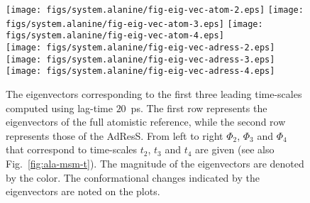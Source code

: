\documentclass[epjST]{svjour}
\begin{document}
\begin{figure}
  \centering
  \texttt{[image: figs/system.alanine/fig-eig-vec-atom-2.eps]}
  \texttt{[image: figs/system.alanine/fig-eig-vec-atom-3.eps]}
  \texttt{[image: figs/system.alanine/fig-eig-vec-atom-4.eps]}\\[-.4cm]
  \texttt{[image: figs/system.alanine/fig-eig-vec-adress-2.eps]}
  \texttt{[image: figs/system.alanine/fig-eig-vec-adress-3.eps]}
  \texttt{[image: figs/system.alanine/fig-eig-vec-adress-4.eps]}\\
  \caption{The eigenvectors corresponding to the first three leading time-scales computed using lag-time $20$~ps.
    The first row represents the eigenvectors of the full atomistic reference, while the second
    row represents those of the AdResS. From left to right $\Phi_2$, $\Phi_3$ and $\Phi_4$ that correspond to
    time-scales $t_2$, $t_3$ and $t_4$ are given (see also Fig.~\ref{fig:ala-msm-t}). The magnitude of the eigenvectors are
    denoted by the color. 
    The conformational
    changes indicated by the eigenvectors are noted on the plots.}
  \label{fig:ala-msm-v}
\end{figure}
\end{document}
